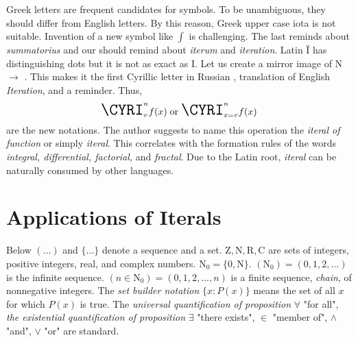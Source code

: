 \documentclass{article}
\begin{document}
Greek letters are frequent candidates for symbols. To be unambiguous, they should differ from English letters. By this reason, Greek upper case iota is not suitable. Invention of a new symbol like $\int$ is challenging. The last reminds about \textit{summatorius} and our should remind about \textit{iterum} and \textit{iteration}. Latin \textrm{\"I} has distinguishing dots but it is not as exact as \textrm{I}. Let us create a mirror image of \textrm{N} $\to$ \CYRI. This makes it the first Cyrillic letter in Russian \textit{\CYRI\cyrt\cyre\cyrr\cyra\cyrc\cyri\cyrya}, translation of English \textit{Iteration}, and a reminder. Thus,
\begin{displaymath}
\textrm{\LARGE{\CYRI}}_{v}^{n}f(x) \; \textrm{or} \; \textrm{\LARGE{\CYRI}}_{x=v}^{n}f(x)
\end{displaymath}
are the new notations. The author suggests to name this operation the \textit{iteral of function} or simply \textit{iteral}. This correlates with the formation rules of the words \textit{integral, differential, factorial,} and \textit{fractal}. Due to the Latin root, \textit{iteral} can be naturally consumed by other languages.

\section{Applications of Iterals}

Below $(\ldots)$ and $\{\ldots\}$ denote a sequence and a set. $\mathrm{Z, N, R, C}$ are sets of integers, positive integers, real, and complex numbers. $\mathrm{N_0} = \{0, \mathrm{N}\}$. $(\mathrm{N_0}) = (0, 1, 2, ... )$ is the infinite sequence. $(n \in \mathrm{N_0}) = (0, 1, 2, ..., n)$ is a finite sequence, \textit{chain}, of nonnegative integers. The \textit{set builder notation} $\{x : P(x)\}$ means the set of all $x$ for which $P(x)$ is true. The \textit{universal quantification of proposition} $\forall$ "for all", \textit{the existential quantification of proposition} $\exists$ "there exists", $\in$ "member of", $\wedge$ "and", $\vee$ "or" are standard. 
\end{document}
